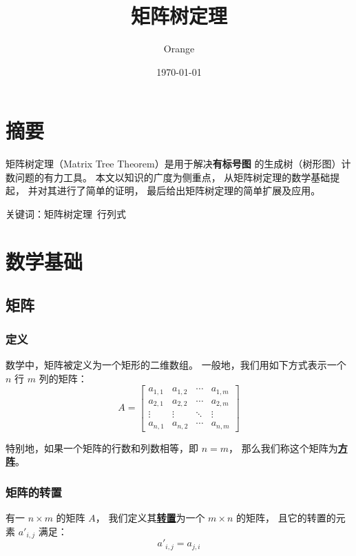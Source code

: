\documentclass[UTF8]{article}
\title{矩阵树定理}
\author{Orange}
\date{\today}
\begin{document}
	\maketitle

	\section{摘要}

	矩阵树定理（Matrix Tree Theorem）是用于解决\textbf{有标号图}
	的生成树（树形图）计数问题的有力工具。
	本文以知识的广度为侧重点，
	从矩阵树定理的数学基础提起，
	并对其进行了简单的证明，
	最后给出矩阵树定理的简单扩展及应用。

	\bigskip

	关键词：矩阵树定理~行列式

	\section{数学基础}

	\subsection{矩阵}

	\subsubsection{定义}

	数学中，矩阵被定义为一个矩形的二维数组。
	一般地，我们用如下方式表示一个 $n$ 行 $m$ 列的矩阵：
	\begin{equation*}
		A =
		\begin{bmatrix}
			a_{1, 1} & a_{1, 2} & \cdots & a_{1, m}
			\\
			a_{2, 1} & a_{2, 2} & \cdots & a_{2, m}
			\\
			\vdots & \vdots & \ddots & \vdots
			\\
			a_{n, 1} & a_{n, 2} & \cdots & a_{n, m}
		\end{bmatrix}
	\end{equation*}

	特别地，如果一个矩阵的行数和列数相等，即 $n = m$，
	那么我们称这个矩阵为\textbf{\uline{方阵}}。

	\subsubsection{矩阵的转置}

	有一 $n \times m$ 的矩阵 $A$，
	我们定义其\textbf{\uline{转置}}为一个 $m \times n$ 的矩阵，
	且它的转置的元素 $a'_{i, j}$ 满足：
	$$
	a'_{i, j} = a_{j, i}
	$$
\end{document}

